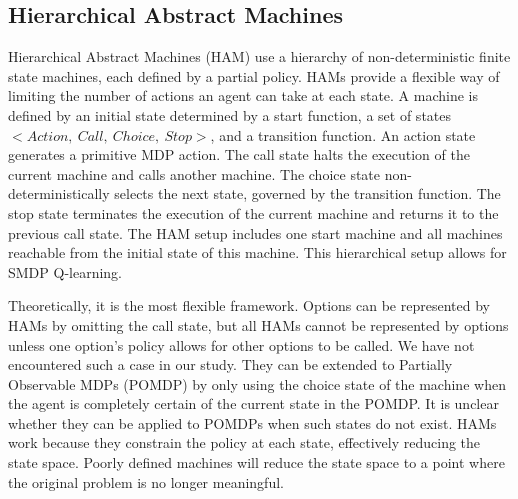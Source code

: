 \subsection{Hierarchical Abstract Machines}

Hierarchical Abstract Machines (HAM) \cite{Parr} use a hierarchy of non-deterministic finite state machines, each defined by a partial policy.
HAMs provide a flexible way of limiting the number of actions an agent can take at each state.
A machine is defined by an initial state determined by a start function, a set of states $<Action,\ Call,\ Choice,\ Stop>$, and a transition function.
An action state generates
a primitive MDP action. The call state halts the
execution of the current machine and calls another
machine. The choice state non-deterministically selects the next state, governed by the transition function. The
stop state terminates the execution of the current machine and returns it to the previous call state. The HAM setup includes one start machine and all machines reachable from the initial state of this machine. This hierarchical setup allows for SMDP Q-learning. 

Theoretically, it is the most flexible framework. Options can be represented
by HAMs by omitting the call state, but all HAMs cannot be represented by
options unless one option's policy allows for other options to be called. We
have not encountered such a case in our study. They can be extended to Partially Observable MDPs (POMDP)
by only using the choice state of the machine when the agent is completely
certain of the current state in the POMDP. It is unclear whether they can be
applied to POMDPs when such states do not exist. HAMs work because they
constrain the policy at each state, effectively reducing the state space.
Poorly defined machines will reduce the state space to a point where the
original problem is no longer meaningful.

